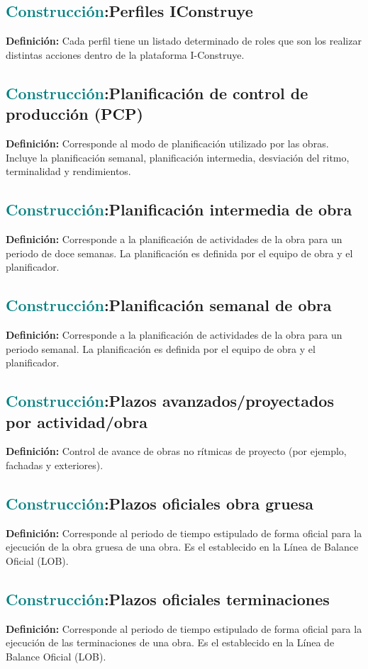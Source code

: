 \documentclass[12pt]{article}
\begin{document}
\subsection{\textcolor{teal}{Construcción}:{Perfiles IConstruye}}
\textbf{Definición:} Cada perfil tiene un listado determinado de roles que son los realizar distintas acciones dentro de la plataforma I-Construye.
\subsection{\textcolor{teal}{Construcción}:{Planificación de control de producción (PCP)}}
\textbf{Definición:} Corresponde al modo de planificación utilizado por las obras. Incluye la planificación semanal, planificación intermedia, desviación del ritmo, terminalidad y rendimientos.
\subsection{\textcolor{teal}{Construcción}:{Planificación intermedia de obra}}
\textbf{Definición:} Corresponde a la planificación de actividades de la obra para un periodo de doce semanas. La planificación es definida por el equipo de obra y el planificador.
\subsection{\textcolor{teal}{Construcción}:{Planificación semanal de obra}}
\textbf{Definición:} Corresponde a la planificación de actividades de la obra para un periodo semanal. La planificación es definida por el equipo de obra y el planificador.
\subsection{\textcolor{teal}{Construcción}:{Plazos avanzados/proyectados por actividad/obra}}
\textbf{Definición:} Control de avance de obras no rítmicas de proyecto (por ejemplo, fachadas y exteriores).
\subsection{\textcolor{teal}{Construcción}:{Plazos oficiales obra gruesa}}
\textbf{Definición:} Corresponde al periodo de tiempo estipulado de forma oficial para la ejecución de la obra gruesa de una obra. Es el establecido en la Línea de Balance Oficial (LOB).
\subsection{\textcolor{teal}{Construcción}:{Plazos oficiales terminaciones}}
\textbf{Definición:} Corresponde al periodo de tiempo estipulado de forma oficial para la ejecución de las terminaciones de una obra. Es el establecido en la Línea de Balance Oficial (LOB).
\end{document}
